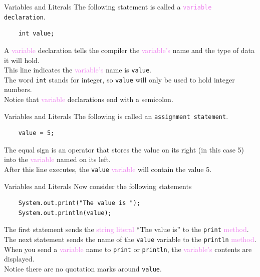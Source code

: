 \documentclass[11pt]{beamer}
\newcommand{\violet}[1]{\textcolor{violet}{#1}}
\begin{document}
\begin{frame}[fragile]{Variables and Literals}
    The following statement is called a \texttt{\violet{variable} declaration}.
    \begin{lstlisting}
    int value;
    \end{lstlisting}
    A \violet{variable} declaration tells the compiler the \violet{variable's} name and the type of data it will hold. \\ \vspace{1em}
    This line indicates the \violet{variable's} name is \texttt{value}. \\ \vspace{1em} 
    The word \texttt{int} stands for integer, so \texttt{value} will only be used to hold integer numbers. \\ \vspace{1em} 
    Notice that \violet{variable} declarations end with a semicolon.
\end{frame}

\begin{frame}[fragile]{Variables and Literals}
    The following is called an \texttt{assignment statement}.
    \begin{lstlisting}
    value = 5;
    \end{lstlisting}
    The equal sign is an operator that stores the value on its right (in this case 5) into the \violet{variable} named on its left. \\ \vspace{1em} 
    After this line executes, the \texttt{value} \violet{variable} will contain the value 5.
\end{frame}

\begin{frame}[fragile]{Variables and Literals}
    Now consider the following statements
    \begin{lstlisting}
    System.out.print("The value is ");
    System.out.println(value);
    \end{lstlisting}
    The first statement sends the \violet{string literal} ``The value is'' to the \texttt{print} \violet{method}. \\ \vspace{1em}
    The next statement sends the name of the \texttt{value} variable to the \texttt{println} \violet{method}. \\ \vspace{1em} 
    When you send a \violet{variable} name to \texttt{print} or \texttt{println}, the \violet{variable's} contents are displayed. \\ \vspace{1em}
    Notice there are no quotation marks around \texttt{value}.
\end{frame}
\end{document}
